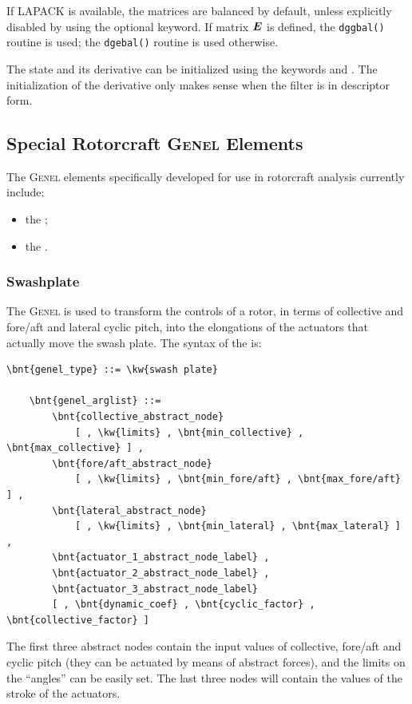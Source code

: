 If LAPACK is available, the matrices are balanced by default,
unless explicitly disabled by using the  optional keyword.
If matrix $\boldsymbol{E}$ is defined, the \texttt{dggbal()} routine is used;
the \texttt{dgebal()} routine is used otherwise.

The state and its derivative can be initialized using the keywords 
and .
The initialization of the derivative only makes sense when the filter
is in descriptor form.



\subsection{Special Rotorcraft \textsc{Genel} Elements}
The \textsc{Genel} elements specifically developed for use
in rotorcraft analysis currently include:
\begin{itemize}
\item the ;
\item the .
\end{itemize}

\subsubsection{Swashplate}
\label{sec:EL:GENEL:SWASHPLATE}
The  \textsc{Genel} is used to transform the controls 
of a rotor, in terms of collective and fore/aft and lateral cyclic pitch, 
into the elongations of the actuators that actually move the swash plate.
The syntax of the  is:
\begin{Verbatim}[commandchars=\\\{\}]
    \bnt{genel_type} ::= \kw{swash plate}

    \bnt{genel_arglist} ::=
        \bnt{collective_abstract_node}
            [ , \kw{limits} , \bnt{min_collective} , \bnt{max_collective} ] ,
        \bnt{fore/aft_abstract_node}
            [ , \kw{limits} , \bnt{min_fore/aft} , \bnt{max_fore/aft} ] ,
        \bnt{lateral_abstract_node} 
            [ , \kw{limits} , \bnt{min_lateral} , \bnt{max_lateral} ] ,
        \bnt{actuator_1_abstract_node_label} ,
        \bnt{actuator_2_abstract_node_label} ,
        \bnt{actuator_3_abstract_node_label} 
        [ , \bnt{dynamic_coef} , \bnt{cyclic_factor} , \bnt{collective_factor} ]
\end{Verbatim}
The first three abstract nodes contain the input values 
of collective, fore/aft and cyclic pitch
(they can be actuated by means of abstract forces),
and the limits on the ``angles'' can be easily set. 
The last three nodes will contain the values of the stroke of the actuators.

